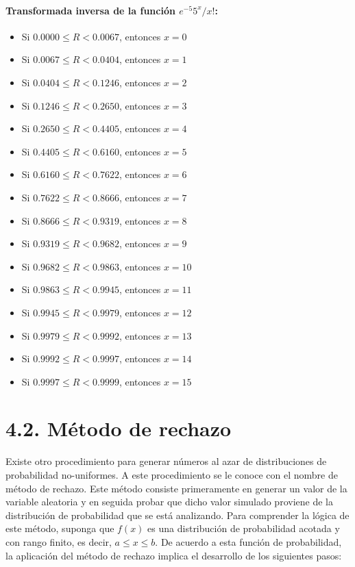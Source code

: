 \documentclass[11pt,letterpaper]{report}
\begin{document}
\paragraph{Transformada inversa de la función $e^{-5}5^x/x!$:}
\begin{itemize}
    \item Si $0.0000 \le R < 0.0067$, entonces $x = 0$
    \item Si $0.0067 \le R < 0.0404$, entonces $x = 1$
    \item Si $0.0404 \le R < 0.1246$, entonces $x = 2$
    \item Si $0.1246 \le R < 0.2650$, entonces $x = 3$
    \item Si $0.2650 \le R < 0.4405$, entonces $x = 4$
    \item Si $0.4405 \le R < 0.6160$, entonces $x = 5$
    \item Si $0.6160 \le R < 0.7622$, entonces $x = 6$
    \item Si $0.7622 \le R < 0.8666$, entonces $x = 7$
    \item Si $0.8666 \le R < 0.9319$, entonces $x = 8$
    \item Si $0.9319 \le R < 0.9682$, entonces $x = 9$
    \item Si $0.9682 \le R < 0.9863$, entonces $x = 10$
    \item Si $0.9863 \le R < 0.9945$, entonces $x = 11$
    \item Si $0.9945 \le R < 0.9979$, entonces $x = 12$
    \item Si $0.9979 \le R < 0.9992$, entonces $x = 13$
    \item Si $0.9992 \le R < 0.9997$, entonces $x = 14$
    \item Si $0.9997 \le R < 0.9999$, entonces $x = 15$
\end{itemize}

\section*{4.2. Método de rechazo}

Existe otro procedimiento para generar números al azar de distribuciones de probabilidad no-uniformes. A este procedimiento se le conoce con el nombre de método de rechazo. Este método consiste primeramente en generar un valor de la variable aleatoria y en seguida probar que dicho valor simulado proviene de la distribución de probabilidad que se está analizando. Para comprender la lógica de este método, suponga que $f(x)$ es una distribución de probabilidad acotada y con rango finito, es decir, $a \le x \le b$. De acuerdo a esta función de probabilidad, la aplicación del método de rechazo implica el desarrollo de los siguientes pasos:
\end{document}
